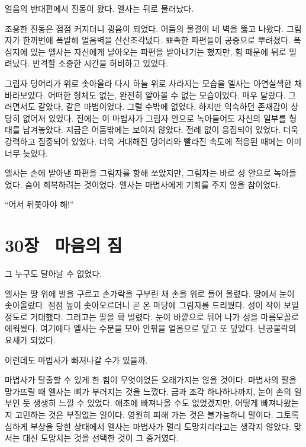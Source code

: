 얼음의 반대편에서 진동이 왔다. 엘사는 뒤로 물러났다.

조용한 진동은 점점 커지더니 굉음이 되었다. 어둠의 물결이 네 벽을 뚫고 나왔다. 그림자가 한꺼번에 폭발해 얼음벽을 산산조각냈다. 뾰족한 파편들이 공중으로 뿌려졌다. 폭심지에 있는 엘사는 자신에게 날아오는 파편을 받아내기는 했지만, 힘 때문에 뒤로 밀려났다. 반격할 소중한 시간을 허비하고 있었다.

그림자 덩어리가 위로 솟아올라 다시 하늘 위로 사라지는 모습을 엘사는 아연실색한 채 바라보았다. 어떠한 형체도 없는, 완전히 알아볼 수 없는 모습이었다. 매우 달랐다. 그러면서도 같았다, 같은 마법이었다. 그럴 수밖에 없었다. 하지만 익숙하던 존재감이 상당히 없어져 있었다. 전에는 이 마법사가 그림자 안으로 녹아들어도 자신의 일부를 형태를 남겨놓았다. 지금은 어둠밖에는 보이지 않았다. 전례 없이 응집되어 있었다. 더욱 강력하고 집중되어 있었다. 더욱 거대해진 덩어리와 빨라진 속도에 적응된 때에는 이미 너무 늦었다.

엘사는 손에 받아낸 파편을 그림자를 향해 쏘았지만, 그림자는 바로 성 안으로 녹아들었다. 숨어 회복하려는 것이었다. 엘사는 마법사에게 기회를 주지 않을 참이었다.

``어서 뒤쫓아야 해!''



\chapter[30장  마음의 짐][30장\hspace*{.5em}마음의 짐]{30장 \ 마음의 짐}



그 누구도 달아날 수 없었다.

엘사는 땅 위에 발을 구르고 손가락을 구부린 채 손을 위로 들어 올렸다. 땅에서 눈이 솟아올랐다. 점점 높이 솟아오르더니 곧 온 마당에 그림자를 드리웠다. 성이 작아 보일 정도로 거대했다. 그러고는 팔을 확 벌렸다. 눈이 바깥으로 튀어 나가 성을 마름모꼴로 에워쌌다. 여기에다 엘사는 수분을 모아 안팎을 얼음으로 덮고 또 덮었다. 난공불락의 요새가 되었다.

이런데도 마법사가 빠져나갈 수가 있을까.

마법사가 탈출할 수 있게 한 힘이 무엇이었든 오래가지는 않을 것이다. 마법사의 팔을 망가뜨릴 때 엘사는 뼈가 부러지는 것을 느꼈다. 금과 조각 하나하나까지, 눈이 손의 일부인 듯 생생히 느낄 수 있었다. 애초에 빠져나올 수도 없었겠지만, 어떻게 빠져나왔는지 고민하는 것은 부질없는 일이다. 영원히 피해 가는 것은 불가능하니 말이다. 그토록 심하게 부상을 당한 상태에서 엘사는 마법사가 멀리 도망치리라고는 생각지 않았다. 맞서는 대신 도망치는 것을 선택한 것이 그 증거였다.

